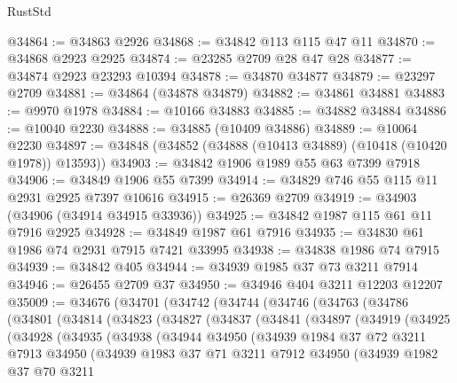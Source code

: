 \begin{lexlean}{RustStd}
\begin{coremodule}
@34864 := @34863 @2926
@34868 := @34842 @113 @115 @47 @11
@34870 := @34868 @2923 @2925
@34874 := @23285 @2709 @28 @47 @28
@34877 := @34874 @2923 @23293 @10394
@34878 := @34870 @34877
@34879 := @23297 @2709
@34881 := @34864 (@34878 @34879)
@34882 := @34861 @34881
@34883 := @9970 @1978
@34884 := @10166 @34883
@34885 := @34882 @34884
@34886 := @10040 @2230
@34888 := @34885 (@10409 @34886)
@34889 := @10064 @2230
@34897 := @34848 (@34852 (@34888 (@10413 @34889) (@10418 (@10420 @1978)) @13593))
@34903 := @34842 @1906 @1989 @55 @63 @7399 @7918
@34906 := @34849 @1906 @55 @7399
@34914 := @34829 @746 @55 @115 @11 @2931 @2925 @7397 @10616
@34915 := @26369 @2709
@34919 := @34903 (@34906 (@34914 @34915 @33936))
@34925 := @34842 @1987 @115 @61 @11 @7916 @2925
@34928 := @34849 @1987 @61 @7916
@34935 := @34830 @61 @1986 @74 @2931 @7915 @7421 @33995
@34938 := @34838 @1986 @74 @7915
@34939 := @34842 @405
@34944 := @34939 @1985 @37 @73 @3211 @7914
@34946 := @26455 @2709 @37
@34950 := @34946 @404 @3211 @12203 @12207
@35009 := @34676
    (@34701
      (@34742
        (@34744
          (@34746
            (@34763
              (@34786
                (@34801
                  (@34814
                    (@34823
                      (@34827
                        (@34837
                          (@34841
                            (@34897
                              (@34919
                                (@34925
                                  (@34928
                                    (@34935
                                      (@34938
                                        (@34944
                                          @34950
                                          (@34939
                                            @1984
                                            @37
                                            @72
                                            @3211
                                            @7913
                                            @34950
                                            (@34939
                                              @1983
                                              @37
                                              @71
                                              @3211
                                              @7912
                                              @34950
                                              (@34939
                                                @1982
                                                @37
                                                @70
                                                @3211

\end{coremodule}
\end{lexlean}
